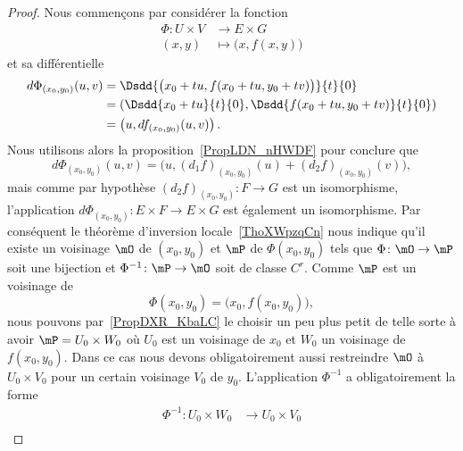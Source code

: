 \begin{proof}
	Nous commençons par considérer la fonction
	\begin{equation}
		\begin{aligned}
			\Phi\colon U\times V & \to E\times G                \\
			(x,y)                & \mapsto \big( x,f(x,y) \big)
		\end{aligned}
	\end{equation}
	et sa différentielle
	\begin{subequations}
		\begin{align}
			d\Phi_{(x_0,y_0)}(u,v) & = \Dsdd{ \big( x_0+tu,f(x_0+tu,y_0+tv) \big) }{t}{0}                   \\
			                       & = \left( \Dsdd{ x_0+tu }{t}{0},\Dsdd{ f(x_0+tu,y_0+tv) }{t}{0} \right) \\
			                       & = \left( u,df_{(x_0,y_0)}(u,v) \right).
		\end{align}
	\end{subequations}
	Nous utilisons alors la proposition~\ref{PropLDN_nHWDF} pour conclure que
	\begin{equation}
		d\Phi_{(x_0,y_0)}(u,v)=\big( u,(d_1f)_{(x_0,y_0)}(u)+(d_2f)_{(x_0,y_0)}(v) \big),
	\end{equation}
	mais comme par hypothèse \( (d_2f)_{(x_0,y_0)}\colon F\to G\) est un isomorphisme, l'application \( d\Phi_{(x_0,y_0)}\colon E\times F\to E\times G\) est également un isomorphisme. Par conséquent le théorème d'inversion locale~\ref{ThoXWpzqCn} nous indique qu'il existe un voisinage \( \mO\) de \( (x_0,y_0)\) et \( \mP\) de \( \Phi(x_0,y_0)\) tels que \( \Phi\colon \mO\to \mP\) soit une bijection et \( \Phi^{-1}\colon \mP\to \mO\) soit de classe \( C^r\). Comme \( \mP\) est un voisinage de
	\begin{equation}
		\Phi(x_0,y_0)=\big( x_0,f(x_0,y_0) \big),
	\end{equation}
	nous pouvons par~\ref{PropDXR_KbaLC} le choisir un peu plus petit de telle sorte à avoir \( \mP=U_0\times W_0\) où \( U_0\) est un voisinage de \( x_0\) et \( W_0\) un voisinage de \( f(x_0,y_0)\). Dans ce cas nous devons obligatoirement aussi restreindre \( \mO\) à \( U_0\times V_0\) pour un certain voisinage \( V_0\) de \( y_0\). L'application \( \Phi^{-1}\) a obligatoirement la forme
	\begin{equation}    \label{EqMHT_QrHRn}
		\begin{aligned}
			\Phi^{-1}\colon U_0\times W_0 & \to U_0\times V_0            \\

\end{aligned}
\end{equation}
\end{proof}
